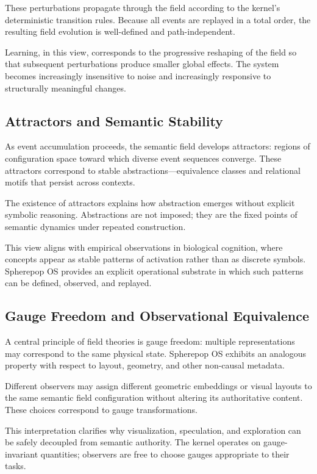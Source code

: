 \documentclass[11pt]{article}
\begin{document}
These perturbations propagate through the field according to the kernel’s
deterministic transition rules. Because all events are replayed in a total
order, the resulting field evolution is well-defined and path-independent.

Learning, in this view, corresponds to the progressive reshaping of the
field so that subsequent perturbations produce smaller global effects.
The system becomes increasingly insensitive to noise and increasingly
responsive to structurally meaningful changes.

\subsection{Attractors and Semantic Stability}

As event accumulation proceeds, the semantic field develops attractors:
regions of configuration space toward which diverse event sequences
converge. These attractors correspond to stable abstractions—equivalence
classes and relational motifs that persist across contexts.

The existence of attractors explains how abstraction emerges without
explicit symbolic reasoning. Abstractions are not imposed; they are the
fixed points of semantic dynamics under repeated construction.

This view aligns with empirical observations in biological cognition, where
concepts appear as stable patterns of activation rather than as discrete
symbols. Spherepop OS provides an explicit operational substrate in which
such patterns can be defined, observed, and replayed.

\subsection{Gauge Freedom and Observational Equivalence}

A central principle of field theories is gauge freedom: multiple
representations may correspond to the same physical state. Spherepop OS
exhibits an analogous property with respect to layout, geometry, and other
non-causal metadata.

Different observers may assign different geometric embeddings or visual
layouts to the same semantic field configuration without altering its
authoritative content. These choices correspond to gauge transformations.

This interpretation clarifies why visualization, speculation, and
exploration can be safely decoupled from semantic authority. The kernel
operates on gauge-invariant quantities; observers are free to choose gauges
appropriate to their tasks.
\end{document}
